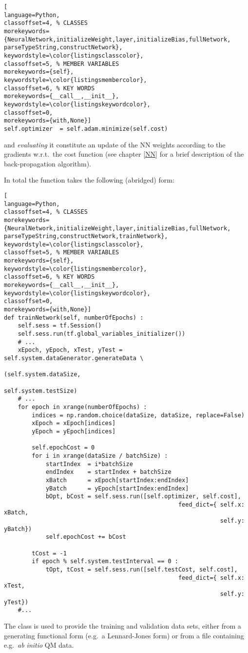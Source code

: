 \documentclass[../../master.tex]{subfiles}
\begin{document}
\begin{lstlisting}[
language=Python,
classoffset=4, % CLASSES
morekeywords={NeuralNetwork,initializeWeight,layer,initializeBias,fullNetwork, parseTypeString,constructNetwork},
keywordstyle=\color{listingsclasscolor},
classoffset=5, % MEMBER VARIABLES
morekeywords={self},
keywordstyle=\color{listingsmembercolor},
classoffset=6, % KEY WORDS
morekeywords={__call__,__init__},
keywordstyle=\color{listingskeywordcolor},
classoffset=0,
morekeywords={with,None}]
self.optimizer  = self.adam.minimize(self.cost)
\end{lstlisting}
and \emph{evaluating} it constitute an update of the NN weights according to the gradients w.r.t.\ the cost function (see chapter \ref{NN} for a brief description of the back-propagation algorithm). 

In total the  function takes the following (abridged) form:
\begin{lstlisting}[
language=Python,
classoffset=4, % CLASSES
morekeywords={NeuralNetwork,initializeWeight,layer,initializeBias,fullNetwork, parseTypeString,constructNetwork,trainNetwork},
keywordstyle=\color{listingsclasscolor},
classoffset=5, % MEMBER VARIABLES
morekeywords={self},
keywordstyle=\color{listingsmembercolor},
classoffset=6, % KEY WORDS
morekeywords={__call__,__init__},
keywordstyle=\color{listingskeywordcolor},
classoffset=0,
morekeywords={with,None}]
def trainNetwork(self, numberOfEpochs) :
    self.sess = tf.Session()
    self.sess.run(tf.global_variables_initializer())
    # ...
    xEpoch, yEpoch, xTest, yTest = self.system.dataGenerator.generateData \
                                                          (self.system.dataSize,
                                                           self.system.testSize)
    # ...
    for epoch in xrange(numberOfEpochs) :
        indices = np.random.choice(dataSize, dataSize, replace=False)
        xEpoch = xEpoch[indices]
        yEpoch = yEpoch[indices]      

        self.epochCost = 0
        for i in xrange(dataSize / batchSize) :
            startIndex  = i*batchSize
            endIndex    = startIndex + batchSize
            xBatch      = xEpoch[startIndex:endIndex]
            yBatch      = yEpoch[startIndex:endIndex]
            bOpt, bCost = self.sess.run([self.optimizer, self.cost], 
                                                  feed_dict={ self.x: xBatch, 
                                                              self.y: yBatch})
            self.epochCost += bCost

        tCost = -1
        if epoch % self.system.testInterval == 0 :
            tOpt, tCost = self.sess.run([self.testCost, self.cost], 
                                                  feed_dict={ self.x: xTest, 
                                                              self.y: yTest})
    #...
\end{lstlisting}
The  class is used to provide the training and validation data sets, either from a generating functional form (e.g.\ a Lennard-Jones form) or from a file containing e.g.\ \emph{ab initio} QM data.
\end{document}
